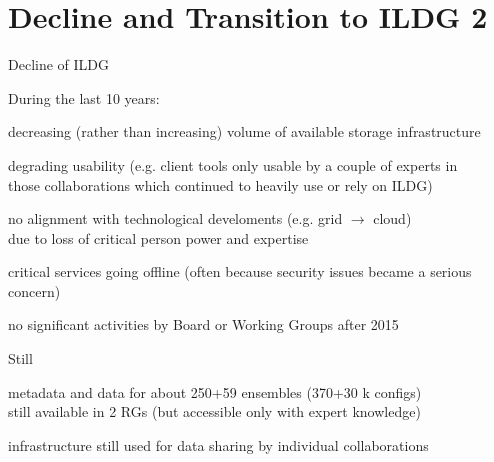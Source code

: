 \documentclass[aspectratio=169,xcolor=dvipsnames]{beamer}
\begin{document}
\section{Decline and Transition to ILDG 2}
\begin{frame}{Decline of ILDG}

  During the last 10 years:
  \begin{dinglist}{56}
  \item decreasing (rather than increasing) volume of available storage infrastructure
  \item degrading usability (e.g. client tools only usable by a couple of experts in\\
    those collaborations which continued to heavily use or rely on ILDG)
  \item no alignment with technological develoments (e.g. grid $\to$ cloud) \\
    due to loss of critical person power and expertise
  \item critical services going offline (often because security issues became a serious concern)
  \item no significant activities by Board or Working Groups after 2015
  \end{dinglist}
  Still
  \begin{dinglist}{52}
       \item metadata and data for about 250+59 ensembles (370+30 k configs) \\
       still available in 2 RGs (but accessible only with expert knowledge)
       \item infrastructure still used for data sharing by individual collaborations
\end{dinglist}


\end{frame}
\end{document}
